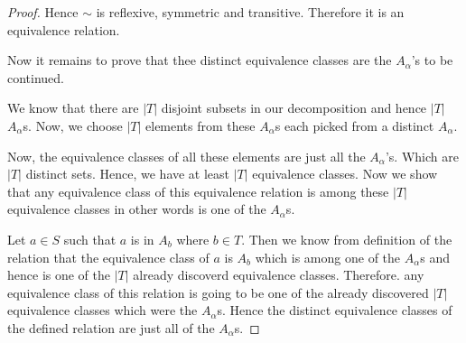 \begin{proof}
Hence \( \sim  \) is reflexive, symmetric and transitive. Therefore it is an equivalence relation.

Now it remains to prove that thee distinct equivalence classes are the \( A_{\alpha} \)'s to be continued.

We know that there are \( |T  | \) disjoint subsets in our decomposition and hence 
\( | T | \) \( A_{\alpha } \)s. Now, we choose \( | T | \) elements from these \( A_{\alpha} \)s each picked from a distinct \( A_{\alpha } \).

Now, the equivalence classes of all these elements are just all the \( A_{\alpha} \)'s. Which are \( |T  | \) distinct sets. Hence, we have at least \( |T  | \) equivalence classes. Now we 
show that any equivalence class of this equivalence relation is among these \( |T  | \) equivalence classes in other words is one of the \( A_{\alpha} \)s.

Let \( a \in S \) such that \( a  \) is in \( A_{b} \) where \( b \in T \). Then we know from definition of the relation that the equivalence class of 
\( a \) is \( A_{b} \) which is among one of the \( A_{\alpha} \)s and hence is one of the \( |T  | \) already discoverd equivalence classes. Therefore. any equivalence
class of this relation is going to be one of the already discovered \( |T  | \) equivalence classes which were the \( A_{\alpha} \)s. Hence the distinct equivalence classes of the defined relation are just all
of the \( A_{\alpha } \)s.
\end{proof}
